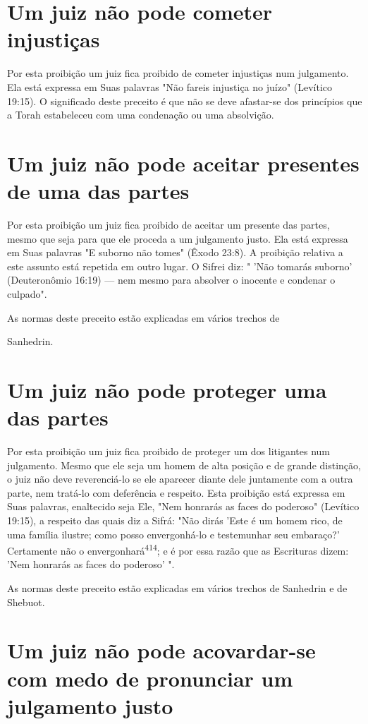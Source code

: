 \begin{itemize}
\begin{enumrate}
\begin{itemize}
\begin{itemize}
\begin{itemize}
\section{Um juiz não pode cometer injustiças}

Por esta proibição um juiz fica proibido de cometer injustiças num
julgamento. Ela está expressa em Suas palavras "Não fareis injustiça no
juízo" (Levítico 19:15). O significado deste preceito é que não se deve
afastar-se dos princípios que a Torah estabeleceu com uma condenação ou
uma absolvição.

\section{Um juiz não pode aceitar presentes de uma das partes}

Por esta proibição um juiz fica proibido de aceitar um presente das
partes, mesmo que seja para que ele proceda a um julgamento justo. Ela
está expressa em Suas palavras "E suborno não tomes" (Êxodo 23:8). A
proibição relativa a este assunto está repetida em outro lugar. O Sifrei
diz: " 'Não tomarás suborno' (Deuteronômio 16:19) --- nem mesmo para
absolver o inocente e con­denar o culpado".


As normas deste preceito estão explicadas em vários trechos de


Sanhedrin.

\section{Um juiz não pode proteger uma das partes}

Por esta proibição um juiz fica proibido de proteger um dos litigan­tes
num julgamento. Mesmo que ele seja um homem de alta posição e de gran­de
distinção, o juiz não deve reverenciá-lo se ele aparecer diante dele
junta­mente com a outra parte, nem tratá-lo com deferência e respeito.
Esta proibi­ção está expressa em Suas palavras, enaltecido seja Ele,
"Nem honrarás as faces do poderoso" (Levítico 19:15), a respeito das
quais diz a Sifrá: "Não dirás 'Este é um homem rico, de uma família
ilustre; como posso envergonhá-lo e teste­munhar seu embaraço?'
Certamente não o envergonhará\textsuperscript{414}; e é por essa razão
que as Escrituras dizem: 'Nem honrarás as faces do poderoso' ".

As normas deste preceito estão explicadas em vários trechos de
Sa­nhedrin e de Shebuot.

\section{Um juiz não pode acovardar-se com medo de pronunciar um julgamento justo}


\end{itemize}
\end{itemize}
\end{itemize}
\end{enumrate}
\end{itemize}
